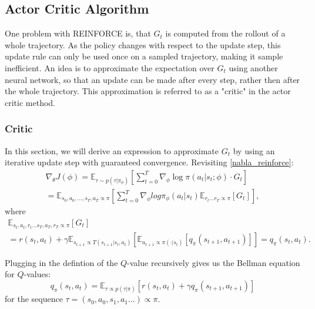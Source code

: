 \subsection{Actor Critic Algorithm}
\label{AC-Alg}
One problem with REINFORCE is, that $G_t$ is computed from the rollout of a whole trajectory. As the policy changes with respect to the update step, this update 
rule can only be used once on a sampled trajectory, making it sample inefficient. An idea is to approximate the expectation over $G_t$ using another neural network, so that an update can be made after every step, 
rather then after the whole trajectory. This approximation is referred to as a "critic" in the actor critic method.

\subsubsection{Critic}
In this section, we will derive an expression to approximate $G_t$ by using an iterative update step with guaranteed convergence.
Revisiting \ref{nabla_reinforce}: 
\begin{equation}
    \label{ac policy update}
    \begin{aligned}
        \nabla_{\theta} J(\phi) = \mathbb{E}_{\tau \sim p(\tau | \pi_{\phi})} \left[ \sum_{t=0}^T \nabla_{\phi} \log \pi(a_t|s_t;\phi) \cdot  G_t\right]\\
        = \mathbb{E}_{s_0, a_0, ... ,s_T, a_T \propto \pi} \left[
            \sum_{t=0}^{T}\nabla_{\phi} log \pi_{\phi}(a_t|s_t) \mathbb{E}_{r_t...r_T \propto \pi} \left[ G_t \right]
        \right],
    \end{aligned}
\end{equation}
where 
\begin{equation}
    \begin{align}
        \mathbb{E}_{s_t, a_t, r_t...s_T, a_T, r_T \propto \pi} \left[ G_t \right] \\
        = r(s_t,a_t) + \gamma \mathbb{E}_{s_{t+1} \propto T(s_{t+1}|s_t, a_t)}\left[\mathbb{E}_{a_{t+1} \propto \pi(\cdot|s_t)}  \left[q_{\pi}(s_{t+1},a_{t+1})\right]  \right]
        = q_{\pi}(s_{t},a_{t}).
    \end{align}
\end{equation}

Plugging in the defintion of the $Q$-value recursively gives us the Bellman equation for $Q$-values:
\begin{equation}
q_{\pi}(s_t, a_t) = \mathbb{E}_{\tau \propto p(\tau|\pi)} \left[ r(s_t,a_t) + \gamma q_{\pi}(s_{t+1}, a_{t+1})\right]
\end{equation}
for the sequence $\tau = (s_0,a_0, s_1, a_1...) \propto \pi$.\\

